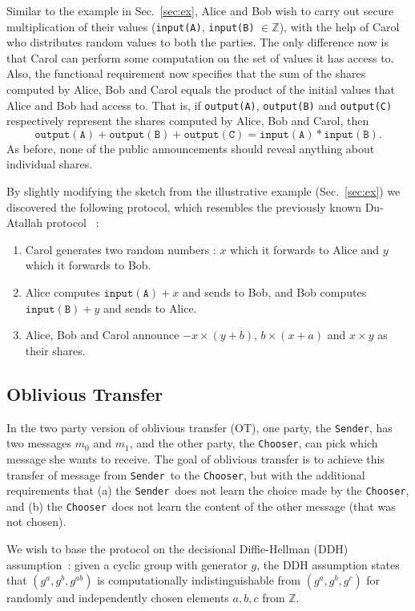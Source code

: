 \documentclass[preprint]{sig-alternate-05-2015}
\def\sender{{\tt{Sender}}}
\def\chooser{{\tt{Chooser}}}
\begin{document}
Similar to the example in Sec.~\ref{sec:ex}, 
Alice and Bob wish to carry out secure multiplication of 
their values (\texttt{input(A)}, \texttt{input(B)} $\in \mathbb{Z}$),
with the help of Carol who distributes random values to both the parties.
The only difference now is that Carol can perform some computation
on the set of values it has access to. 
Also, the functional requirement now specifies
that the sum of the shares computed by Alice, Bob 
and Carol equals the product of the initial values 
that Alice and Bob had access to.
That is, if \texttt{output(A)}, \texttt{output(B)} and \texttt{output(C)}
respectively represent the shares computed by Alice, Bob and Carol, then
$$
\mathtt{output(A)} + \mathtt{output(B)} + \mathtt{output(C)} = \mathtt{input(A)}*\mathtt{input(B)}.
$$
As before, none of the public announcements should reveal anything
about individual shares.

By slightly modifying the sketch from the illustrative example 
(Sec.~\ref{sec:ex}) we discovered the following 
protocol, which resembles the previously known Du-Atallah protocol~\cite{DA01} :

\begin{enumerate}
    \item Carol generates two random numbers : $x$ which it forwards to Alice
        and $y$ which it forwards to Bob.
    \item Alice computes $\mathtt{input(A)} + x$ and sends to Bob,
        and Bob computes $\mathtt{input(B)} + y$ and sends to Alice.
    \item Alice, Bob and Carol announce $-x\times(y+b)$, $b\times(x+a)$ and 
        $x\times y$ as their shares.
\end{enumerate}

\subsection{Oblivious Transfer}

In the two party version of oblivious transfer (OT), 
one party, the \sender, has two messages $m_0$ and $m_1$,
and the other party, the \chooser, can pick which message she wants to receive.
The goal of oblivious transfer is to achieve this transfer of
message from \sender\ to the \chooser, but with the additional
requirements that
(a) the \sender\ does not learn the choice made by the \chooser,
and
(b) the \chooser\ does not learn the content of the other message 
(that was not chosen).

We wish to base the protocol on the decisional Diffie-Hellman (DDH) assumption~\cite{Boneh:DDH}:
given a cyclic group with generator $g$, the DDH assumption states that
$(g^a,g^b,g^{ab})$ is computationally indistinguishable from
$(g^a,g^b,g^c)$ for randomly and independently chosen elements $a,b,c$ from $\mathbb{Z}$.
\end{document}
